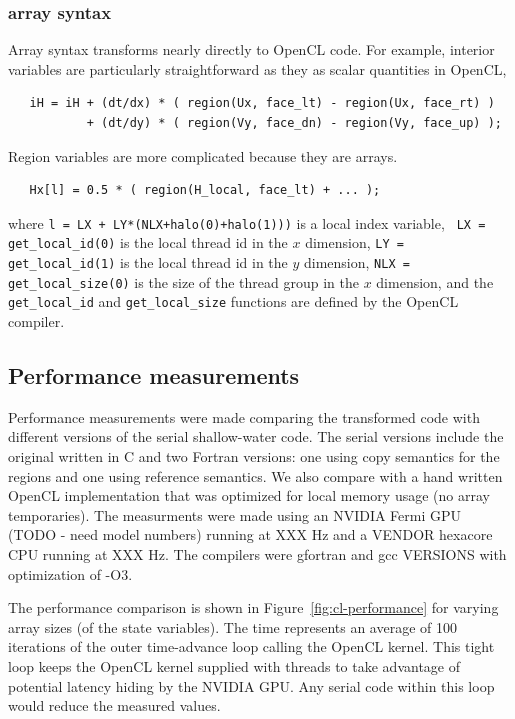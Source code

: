 \subsubsection{array syntax}

Array syntax transforms nearly directly to OpenCL code.  For example, interior
variables are particularly straightforward as they as scalar quantities in
OpenCL,
\begin{verbatim}
   iH = iH + (dt/dx) * ( region(Ux, face_lt) - region(Ux, face_rt) )
           + (dt/dy) * ( region(Vy, face_dn) - region(Vy, face_up) );
\end{verbatim}

Region variables are more complicated because they are arrays.
\begin{verbatim}
   Hx[l] = 0.5 * ( region(H_local, face_lt) + ... );
\end{verbatim}
where {\tt l = LX + LY*(NLX+halo(0)+halo(1)))} is a local index variable, {\tt
  LX = get_local_id(0)} is the local thread id in the $x$ dimension, {\tt LY =
  get_local_id(1)} is the local thread id in the $y$ dimension, {\tt NLX =
  get_local_size(0)} is the size of the thread group in the $x$ dimension, and
the {\tt get_local_id} and {\tt get_local_size} functions are defined by the
OpenCL compiler.


\subsection{Performance measurements}

Performance measurements were made comparing the transformed code with
different versions of the serial shallow-water code.  The serial versions
include the original written in C and two Fortran versions: one using copy
semantics for the regions and one using reference semantics.  We also compare
with a hand written OpenCL implementation that was optimized for local memory
usage (no array temporaries).  The measurments were made using an NVIDIA Fermi
GPU (TODO - need model numbers) running at XXX Hz and a VENDOR hexacore CPU
running at XXX Hz.  The compilers were gfortran and gcc VERSIONS with
optimization of -O3.

The performance comparison is shown in Figure~\ref{fig:cl-performance} for
varying array sizes (of the state variables).  The time represents an average
of 100 iterations of the outer time-advance loop calling the OpenCL kernel.
This tight loop keeps the OpenCL kernel supplied with threads to take
advantage of potential latency hiding by the NVIDIA GPU.  Any serial code
within this loop would reduce the measured values.

